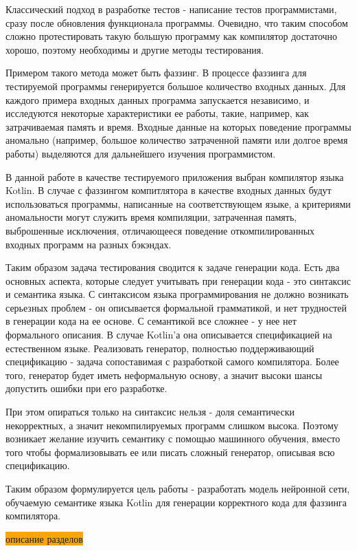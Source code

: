 \documentclass[times,specification,annotation]{itmo-student-thesis}
\begin{document}
Классический подход в разработке тестов - написание тестов программистами, сразу после обновления функционала программы. Очевидно, что таким способом сложно протестировать такую большую программу как компилятор достаточно хорошо, поэтому необходимы и другие методы тестирования.

Примером такого метода может быть фаззинг. В процессе фаззинга для тестируемой программы генерируется большое количество входных данных. Для каждого примера входных данных программа запускается независимо, и исследуются некоторые характеристики ее работы, такие, например, как затрачиваемая память и время. Входные данные на которых поведение программы аномально (например, большое количество затраченной памяти или долгое время работы) выделяются для дальнейшего изучения программистом.

В данной работе в качестве тестируемого приложения выбран компилятор языка Kotlin. В случае с фаззингом компитлятора в качестве входных данных будут использоваться программы, написанные на соответствующем языке, а критериями аномальности могут служить время компиляции, затраченная память, выброшенные исключения, отличающееся поведение откомпилированных входных программ на разных бэкэндах.

Таким образом задача тестирования сводится к задаче генерации кода. Есть два основных аспекта, которые следует учитывать при генерации кода - это синтаксис и семантика языка. С синтаксисом языка программирования не должно возникать серьезных проблем - он описывается формальной грамматикой, и нет трудностей в генерации кода на ее основе. С семантикой все сложнее - у нее нет формального описания. В случае Kotlin'а она описывается спецификацией на естественном языке. Реализовать генератор, полностью поддерживающий спецификацию - задача сопоставимая с разработкой самого компилятора. Более того, генератор будет иметь неформальную основу, а значит высоки шансы допустить ошибки при его разработке.

При этом опираться только на синтаксис нельзя - доля семантически некорректных, а значит некомпилируемых программ слишком высока. Поэтому возникает желание изучить семантику с помощью машинного обучения, вместо того чтобы формализовывать ее или писать сложный генератор, описывая всю спецификацию.

Таким образом формулируется цель работы - разработать модель нейронной сети, обучаемую семантике языка Kotlin для генерации корректного кода для фаззинга компилятора.

\colorbox{orange}{описание разделов}
\end{document}
